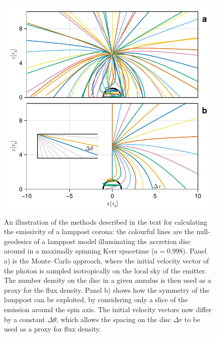 \documentclass[fleqn,usenatbib]{mnras}
\begin{document}
\begin{figure}
    \centering
    \includegraphics[width=0.95\columnwidth]{figures/emissivity.coronal-traces.pdf}
    \caption{An illustration of the methods described in the text for
        calculating the emissivity of a lamppost corona: the colourful lines are
        the null-geodesics of a lamppost model illuminating the accretion disc
        around in a maximally spinning Kerr spacetime ($a = 0.998$). Panel a) is
        the Monte--Carlo approach, where the initial velocity vector of the
        photon is sampled isotropically on the local sky of the emitter. The
        number density on the disc in a given annulus is then used as a proxy
        for the flux density. Panel b) shows how the symmetry of the lamppost can
        be exploited, by considering only a slice of the emission around the
        spin axis. The initial velocity vectors now differ by a constant $\Delta
    \theta$, which allows the spacing on the disc $\Delta r$ to be used as a
proxy for flux density.}
    \label{fig:coronal-tracing}
\end{figure}

\end{document}
